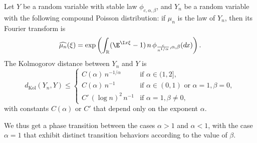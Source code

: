 \documentclass[envcountsame]{svmult}
\newcommand{\R}{\mathbb{R}}
\newcommand{\dkol}{d_\mathrm{Kol}}
\newcommand{\DD}[1]{\,d\hspace*{-0.3mm}{#1}}
\begin{document}
\begin{proposition}
\label{prop:compoundpoisson}
Let $Y$ be a random variable with stable law $\phi_{c,\alpha,\beta}$, and $Y_n$ be a random variable with the following compound Poisson distribution: if $\mu_n$ is the law of $Y_n$, then its Fourier transform is
$$\widehat{\mu_n}(\xi) = \exp\left(\int_{\R} (\E^{\I x\xi}-1)\,n\,\phi_{\frac{c}{n^{1/\alpha}},\alpha,\beta}(\!\DD{x})\right).$$
The Kolmogorov distance between $Y_n$ and $Y$ is
$$\dkol(Y_n,Y) \leq \begin{cases}
	C(\alpha)\,n^{-1/\alpha} &\text{if }\alpha \in (1,2],\\
	C(\alpha)\,n^{-1}&\text{if }\alpha \in (0,1) \text{ or }\alpha=1,\beta=0,\\
    C'\,(\log n)^2\,n^{-1}&\text{if } \alpha=1,\beta\neq 0,
\end{cases}$$
with constants $C(\alpha)$ or $C'$ that depend only on the exponent $\alpha$.
\end{proposition}

\noindent We thus get a phase transition between the cases $\alpha>1$ and $\alpha<1$, with the case $\alpha=1$ that exhibit distinct transition behaviors according to the value of $\beta$.
\end{document}
